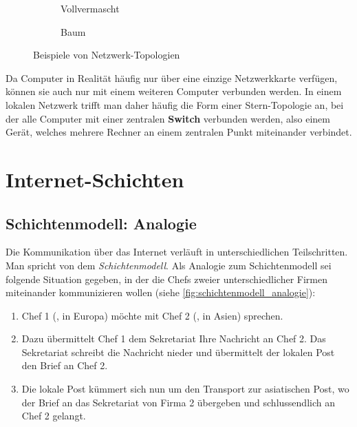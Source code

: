 \begin{figure}[H]
\begin{subfigure}[b]{0.25\textwidth}
		\caption{Vollvermascht}
	\end{subfigure}
	\begin{subfigure}{.25\textwidth}
		\centering
		\caption{Baum}
	\end{subfigure}
	\caption{Beispiele von Netzwerk-Topologien}
	\label{fig:topologie}
\end{figure}

Da Computer in Realität häufig nur über eine einzige Netzwerkkarte verfügen, können sie auch nur mit einem weiteren Computer verbunden werden. In einem lokalen Netzwerk trifft man daher häufig die Form einer Stern-Topologie an, bei der alle Computer mit einer zentralen \textbf{Switch} verbunden werden, also einem Gerät, welches mehrere Rechner an einem zentralen Punkt miteinander verbindet.

\newpage
\section{Internet-Schichten}
\subsection{Schichtenmodell: Analogie}
Die Kommunikation über das Internet verläuft in unterschiedlichen Teilschritten. Man spricht von dem \textit{Schichtenmodell}. Als Analogie zum Schichtenmodell sei folgende Situation gegeben, in der die Chefs zweier unterschiedlicher Firmen miteinander kommunizieren wollen (siehe \cref{fig:schichtenmodell_analogie}):
\begin{enumerate}
	\item Chef 1 (\faFemale, in Europa) möchte mit Chef 2 (\faMale, in Asien) sprechen.
	\item Dazu übermittelt Chef 1 dem Sekretariat Ihre Nachricht an Chef 2. Das Sekretariat schreibt die Nachricht nieder und übermittelt der lokalen Post den Brief an Chef 2.
	\item Die lokale Post kümmert sich nun um den Transport zur asiatischen Post, wo der Brief an das Sekretariat von Firma 2 übergeben und schlussendlich an Chef 2 gelangt.
\end{enumerate}

